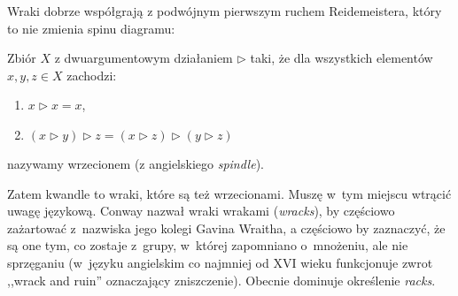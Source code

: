 Wraki dobrze współgrają z podwójnym pierwszym ruchem Reidemeistera, który to nie zmienia spinu diagramu:
\begin{comment}
\[
    \begin{tikzpicture}[baseline=-0.65ex,scale=0.07]
    \begin{knot}[clip width=5,flip crossing/.list={1}]
        \strand[semithick] (15, 0) [in=up,out=left] to (-5, -7);
        \strand[semithick] (-5, -7) [in=down,out=down] to (5, -7);
        \strand[semithick] (5, -7) [in=right,out=up] to (-15, 0);
        \strand[semithick,Latex-] (45, 0) [in=up,out=left] to (25, -7);
        \strand[semithick] (25, -7) [in=down,out=down] to (35, -7);
        \strand[semithick] (35, -7) [in=right,out=up] to (15, 0);
        \node[darkblue] at (-15, 0)[left] {$x$};
        \node[darkblue] at (15, 0)[above] {$x \triangleright x$};
        \node[darkblue] at (45, 0)[right] {$x$};
    \end{knot}
    \end{tikzpicture}
    \cong
    \begin{tikzpicture}[baseline=-0.65ex,scale=0.07]
    \begin{knot}[clip width=5]
        \strand[semithick,-Latex] (-15, 0) to (15, 0);
        \node[darkblue] at (-15, 0)[left] {$x$};
    \end{knot}
    \end{tikzpicture}
\]
\end{comment}

\begin{definition}[wrzeciono]
    Zbiór $X$ z dwuargumentowym działaniem $\triangleright$ taki, że dla wszystkich elementów $x, y, z \in X$ zachodzi:
    \begin{enumerate}
        \item $x \triangleright x = x$,
        \item $(x \triangleright y) \triangleright z = (x \triangleright z) \triangleright (y \triangleright z)$
    \end{enumerate}
    nazywamy wrzecionem (z angielskiego \emph{spindle}).
\end{definition}

Zatem kwandle to wraki, które są też wrzecionami.
Muszę w~tym miejscu wtrącić uwagę językową.
Conway nazwał wraki wrakami (\emph{wracks}), by częściowo zażartować z~nazwiska jego kolegi Gavina Wraitha, a częściowo by zaznaczyć, że są one tym, co zostaje z~grupy, w~której zapomniano o~mnożeniu, ale nie sprzęganiu (w~języku angielskim co najmniej od XVI wieku funkcjonuje zwrot ,,wrack and ruin'' oznaczający zniszczenie).
Obecnie dominuje określenie \emph{racks}.


